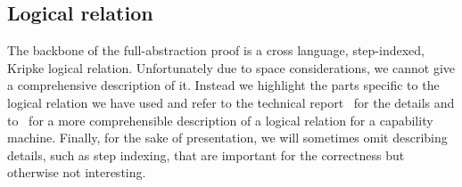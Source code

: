 \documentclass[acmsmall,review,anonymous]{acmart}\settopmatter{printfolios=true,printccs=false,printacmref=false}
\begin{document}
\subsection{Logical relation}
\label{subsec:worlds}
The backbone of the full-abstraction proof is a cross language, step-indexed, Kripke logical relation.
Unfortunately due to space considerations, we cannot give a comprehensive description of it.
Instead we highlight the parts specific to the logical relation we have used and refer to the technical report~\citep{technical_report} for the details and to~\citet{skorstengaard_reasoning_2017} for a more comprehensible description of a logical relation for a capability machine.
Finally, for the sake of presentation, we will sometimes omit describing details, such as step indexing, that are important for the correctness but otherwise not interesting.
\end{document}
